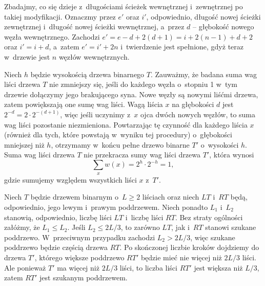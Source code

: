 Zbadajmy, co się dzieje z~długościami ścieżek wewnętrznej i~zewnętrznej po takiej modyfikacji.
Oznaczmy przez $e'$ oraz $i'$, odpowiednio, długość nowej ścieżki zewnętrznej i~długość nowej ścieżki wewnętrznej, a~przez $d$ -- głębokość nowego węzła wewnętrznego.
Zachodzi $e'=e-d+2(d+1)=i+2(n-1)+d+2$ oraz $i'=i+d$, a~zatem $e'=i'+2n$ i~twierdzenie jest spełnione, gdyż teraz w~drzewie jest $n$ węzłów wewnętrznych.

\exercise %
Niech $h$ będzie wysokością drzewa binarnego $T$.
Zauważmy, że badana suma wag liści drzewa $T$ nie zmniejszy się, jeśli do każdego węzła o~stopniu 1 w~tym drzewie dołączymy jego brakującego syna.
Nowe węzły są nowymi liśćmi drzewa, zatem powiększają one sumę wag liści.
Wagą liścia $x$ na głębokości $d$ jest $2^{-d}=2\cdot2^{-(d+1)}$, więc jeśli uczynimy z~$x$ ojca dwóch nowych węzłów, to suma wag liści pozostanie niezmieniona.
Powtarzając tę czynność dla każdego liścia $x$ (również dla tych, które powstają w~wyniku tej procedury) o~głębokości mniejszej niż $h$, otrzymamy w~końcu pełne drzewo binarne $T'$ o~wysokości $h$.
Suma wag liści drzewa $T$ nie przekracza sumy wag liści drzewa $T'$, która wynosi
\[
	\sum_{x}w(x) = 2^h\cdot2^{-h} = 1,
\]
gdzie sumujemy względem wszystkich liści $x$ z~$T'$.

\exercise %

\noindent Niech $T$ będzie drzewem binarnym o~$L\ge2$ liściach oraz niech $LT$ i~$RT$ będą, odpowiednio, jego lewym i~prawym poddrzewem.
Niech ponadto $L_1$ i~$L_2$ stanowią, odpowiednio, liczbę liści $LT$ i~liczbę liści $RT$.
Bez straty ogólności załóżmy, że $L_1\le L_2$.
Jeśli $L_2\le2L/3$, to zarówno $LT$, jak i~$RT$ stanowi szukane poddrzewo.
W~przeciwnym przypadku zachodzi $L_2>2L/3$, więc szukane poddrzewo będzie częścią drzewa $RT$.
Po skończonej liczbie kroków dojdziemy do drzewa $T'$, którego większe poddrzewo $RT'$ będzie mieć nie więcej niż $2L/3$ liści.
Ale ponieważ $T'$ ma więcej niż $2L/3$ liści, to liczba liści $RT'$ jest większa niż $L/3$, zatem $RT'$ jest szukanym poddrzewem.
